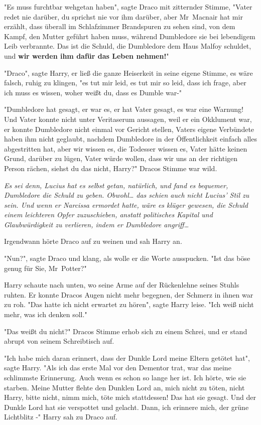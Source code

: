 {"Es muss furchtbar wehgetan haben", sagte Draco mit zitternder Stimme, "Vater redet nie darüber, du sprichst nie vor ihm darüber, aber Mr~Macnair hat mir erzählt, dass überall im Schlafzimmer Brandspuren zu sehen sind, von dem Kampf, den Mutter geführt haben muss, während Dumbledore sie bei lebendigem Leib verbrannte. Das ist die Schuld, die Dumbledore dem Haus Malfoy schuldet, und \textbf{wir werden ihm dafür das Leben nehmen!}"

"Draco", sagte Harry, er ließ die ganze Heiserkeit in seine eigene Stimme, es wäre falsch, ruhig zu klingen, "es tut mir leid, es tut mir so leid, dass ich frage, aber ich muss es wissen, woher weißt du, dass es Dumble war-"

"Dumbledore hat gesagt, er war es, er hat Vater gesagt, es war eine Warnung! Und Vater konnte nicht unter Veritaserum aussagen, weil er ein Okklument war, er konnte Dumbledore nicht einmal vor Gericht stellen, Vaters eigene Verbündete haben ihm nicht geglaubt, nachdem Dumbledore in der Öffentlichkeit einfach alles abgestritten hat, aber wir wissen es, die Todesser wissen es, Vater hätte keinen Grund, darüber zu lügen, Vater würde wollen, dass wir uns an der richtigen Person rächen, siehst du das nicht, Harry?" Dracos Stimme war wild.

\emph{Es sei denn, Lucius hat es selbst getan, natürlich, und fand es bequemer, Dumbledore die Schuld zu geben. Obwohl… das schien auch nicht Lucius' Stil zu sein. Und wenn er Narcissa ermordet hatte, wäre es klüger gewesen, die Schuld einem leichteren Opfer zuzuschieben, anstatt politisches Kapital und Glaubwürdigkeit zu verlieren, indem er Dumbledore angriff…}

Irgendwann hörte Draco auf zu weinen und sah Harry an.

"Nun?", sagte Draco und klang, als wolle er die Worte ausspucken. "Ist das böse genug für Sie, Mr~Potter?"

Harry schaute nach unten, wo seine Arme auf der Rückenlehne seines Stuhls ruhten. Er konnte Dracos Augen nicht mehr begegnen, der Schmerz in ihnen war zu roh. "Das hatte ich nicht erwartet zu hören", sagte Harry leise. "Ich weiß nicht mehr, was ich denken soll."

"Das weißt du nicht?" Dracos Stimme erhob sich zu einem Schrei, und er stand abrupt von seinem Schreibtisch auf.

"Ich habe mich daran erinnert, dass der Dunkle Lord meine Eltern getötet hat", sagte Harry. "Als ich das erste Mal vor den Dementor trat, war das meine schlimmste Erinnerung. Auch wenn es schon so lange her ist. Ich hörte, wie sie starben. Meine Mutter flehte den Dunklen Lord an, mich nicht zu töten, nicht Harry, bitte nicht, nimm mich, töte mich stattdessen! Das hat sie gesagt. Und der Dunkle Lord hat sie verspottet und gelacht. Dann, ich erinnere mich, der grüne Lichtblitz -" Harry sah zu Draco auf.

}
